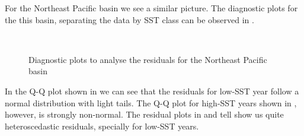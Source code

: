 \bigskip
For the Northeast Pacific basin we see a similar picture. The diagnostic plots for the this basin, separating the data by SST class can be observed in .
\begin{figure}[H]
	\centering
	\\
	\caption{Diagnostic plots to analyse the residuals for the Northeast Pacific basin}
	\label{fig:epac_residuals}
\end{figure}
In the Q-Q plot shown in  we can see that the residuals for low-SST year follow a normal distribution with light tails. The Q-Q plot for high-SST years shown in , however, is strongly non-normal. The residual plots in  and  tell show us quite heteroscedastic residuals, specially for low-SST years.

